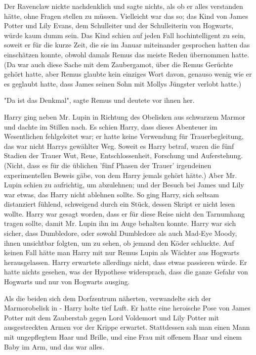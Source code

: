 {Der Ravenclaw nickte nachdenklich und sagte nichts, als ob er alles verstanden hätte, ohne Fragen stellen zu müssen. Vielleicht war das so; das Kind von James Potter und Lily Evans, dem Schulleiter und der Schulleiterin von Hogwarts, würde kaum dumm sein. Das Kind schien auf jeden Fall hochintelligent zu sein, soweit er für die kurze Zeit, die sie im Januar miteinander gesprochen hatten das einschätzen konnte, obwohl damals Remus das meiste Reden übernommen hatte. (Da war auch diese Sache mit dem Zaubergamot, über die Remus Gerüchte gehört hatte, aber Remus glaubte kein einziges Wort davon, genauso wenig wie er es geglaubt hatte, dass James seinen Sohn mit Mollys Jüngster verlobt hatte.)

"Da ist das Denkmal", sagte Remus und deutete vor ihnen her.

Harry ging neben Mr. Lupin in Richtung des Obelisken aus schwarzem Marmor und dachte im Stillen nach. Es schien Harry, dass dieses Abenteuer im Wesentlichen fehlgeleitet war; er hatte keine Verwendung für Trauerbegleitung, das war nicht Harrys gewählter Weg. Soweit es Harry betraf, waren die fünf Stadien der Trauer Wut, Reue, Entschlossenheit, Forschung und Auferstehung. (Nicht, dass es für die üblichen 'fünf Phasen der Trauer' irgendeinen experimentellen Beweis gäbe, von dem Harry jemals gehört hätte.) Aber Mr. Lupin schien zu aufrichtig, um abzulehnen; und der Besuch bei James und Lily war etwas, das Harry nicht ablehnen sollte. So ging Harry, sich seltsam distanziert fühlend, schweigend durch ein Stück, dessen Skript er nicht lesen wollte. Harry war gesagt worden, dass er für diese Reise nicht den Tarnumhang tragen sollte, damit Mr. Lupin ihn im Auge behalten konnte. Harry war sich sicher, dass Dumbledore, oder sowohl Dumbledore als auch Mad-Eye Moody, ihnen unsichtbar folgten, um zu sehen, ob jemand den Köder schluckte. Auf keinen Fall hätte man Harry mit nur Remus Lupin als Wächter aus Hogwarts herausgelassen. Harry erwartete allerdings nicht, dass etwas passieren würde. Er hatte nichts gesehen, was der Hypothese widersprach, dass die ganze Gefahr von Hogwarts und nur von Hogwarts ausging.

Als die beiden sich dem Dorfzentrum näherten, verwandelte sich der Marmorobelisk in - Harry holte tief Luft. Er hatte eine heroische Pose von James Potter mit dem Zauberstab gegen Lord Voldemort und Lily Potter mit ausgestreckten Armen vor der Krippe erwartet. Stattdessen sah man einen Mann mit ungepflegtem Haar und Brille, und eine Frau mit offenem Haar und einem Baby im Arm, und das war alles.

}
